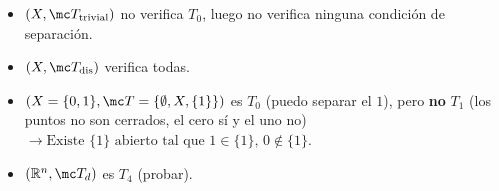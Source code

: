 \begin{ejem}
    \hfill
    \begin{itemize}
        \item $(X, \mc T_{\text{trivial}})$ no verifica $T_0$, luego no verifica ninguna condición de separación.
        \item $(X, \mc T_{\text{dis}})$ verifica todas.
        \item $(X = \{0, 1\}, \mc T = \{\emptyset, X, \{1\}\})$ es $T_0$ (puedo separar el $1$), pero \textbf{no} $T_1$ (los puntos no son cerrados, el cero sí y el uno no) $\rightarrow \text{Existe } \{1\} \text{ abierto tal que } 1 \in \{1\}, \, 0 \notin \{1\}$.
        \item $(\mathbb{R}^n, \mc T_d)$ es $T_4$ (probar).
    \end{itemize}
\end{ejem}





























































































